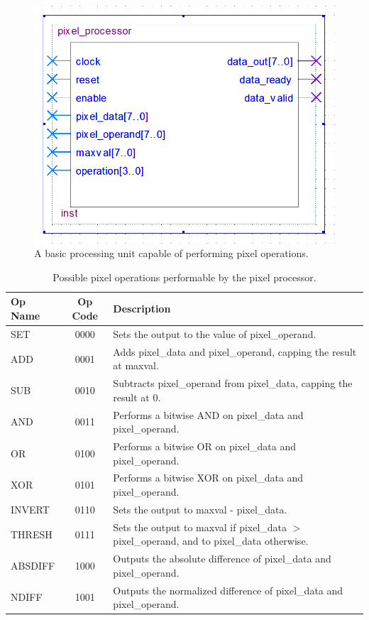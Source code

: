 \documentclass[a4paper, 10pt, titlepage]{article}
\begin{document}
\begin{figure}[htb]
    \centering
    \includegraphics[width=0.5\linewidth]{pixel_processor_entity.PNG}
    \caption{A basic processing unit capable of performing pixel operations.}
    \label{fig:pixel_processor}
\end{figure}

\begin{table}[htb]
    \centering
    \begin{tabular}[c]{ l | c | p{10.5cm} }
        \textbf{Op Name} & \textbf{Op Code} & \textbf{Description} \\
        \hline
        SET & 0000 & Sets the output to the value of pixel\_operand. \\
        ADD & 0001 & Adds pixel\_data and pixel\_operand, capping the result at maxval. \\
        SUB & 0010 & Subtracts pixel\_operand from pixel\_data, capping the result at 0. \\
        AND & 0011 & Performs a bitwise AND on pixel\_data and pixel\_operand. \\
        OR & 0100 & Performs a bitwise OR on pixel\_data and pixel\_operand. \\
        XOR & 0101 & Performs a bitwise XOR on pixel\_data and pixel\_operand. \\
        INVERT & 0110 & Sets the output to maxval - pixel\_data. \\
        THRESH & 0111 & Sets the output to maxval if pixel\_data $>$ pixel\_operand, and to pixel\_data otherwise. \\
        ABSDIFF & 1000 & Outputs the absolute difference of pixel\_data and pixel\_operand. \\
        NDIFF & 1001 & Outputs the normalized difference of pixel\_data and pixel\_operand. \\
    \end{tabular}
    \caption{Possible pixel operations performable by the pixel processor.}
    \label{tab:pixel_operations}
\end{table}
\end{document}
